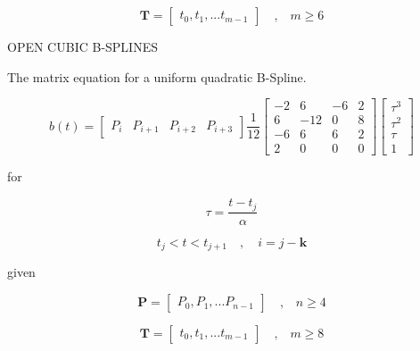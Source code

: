 \documentclass{article}
\begin{document}
    \begin{equation}
        \textbf{T} = \begin{bmatrix} t_0, t_1, ... t_{m-1} \end{bmatrix} \quad \text{,} \quad m \geq 6
    \end{equation}

\hspace{1cm}

OPEN CUBIC B-SPLINES
\hfill \break

    The matrix equation for a uniform quadratic B-Spline.
    
    \begin{equation}
        b(t) = \begin{bmatrix} P_i & P_{i+1} & P_{i+2} & P_{i+3} \end{bmatrix} \frac{1}{12} \begin{bmatrix} -2 & 6 & -6 & 2 \\
                                          6 & -12 & 0 & 8 \\
                                         -6 & 6 & 6 & 2 \\
                                          2 & 0 & 0 & 0 \end{bmatrix} \begin{bmatrix} \tau^3 \\ \tau^2 \\ \tau \\ 1 \end{bmatrix}
    \end{equation}
    
    for
    
    \begin{equation}
        \tau = \frac{t-t_j}{\alpha}
    \end{equation}
    
    \begin{equation}
        t_j < t < t_{j+1} \quad , \quad i = j-\textbf{k}
    \end{equation}
    
    given
    
    \begin{equation}
    \textbf{P} = \begin{bmatrix} P_0, P_1, ... P_{n-1} \end{bmatrix} \quad \text{,} \quad n \geq 4
    \end{equation}
    
    \begin{equation}
        \textbf{T} = \begin{bmatrix} t_0, t_1, ... t_{m-1} \end{bmatrix} \quad \text{,} \quad m \geq 8
    \end{equation}
    
\end{document}
